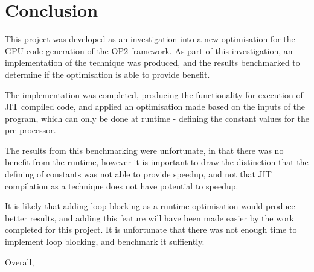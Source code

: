 
\section{Conclusion}
\label{s:conc}

This project was developed as an investigation into a new optimisation for the GPU code generation of the OP2 framework. As part of this investigation, an implementation of the technique was produced, and the results benchmarked to determine if the optimisation is able to provide benefit.
\par
The implementation was completed, producing the functionality for execution of JIT compiled code, and applied an optimisation made based on the inputs of the program, which can only be done at runtime - defining the constant values for the pre-processor.
\par
The results from this benchmarking were unfortunate, in that there was no benefit from the runtime, however it is important to draw the distinction that the defining of constants was not able to provide speedup, and not that JIT compilation as a technique does not have potential to speedup.
\par
It is likely that adding loop blocking as a runtime optimisation would produce better results, and adding this feature will have been made easier by the work completed for this project. It is unfortunate that there was not enough time to implement loop blocking, and benchmark it suffiently.
\par
Overall,

